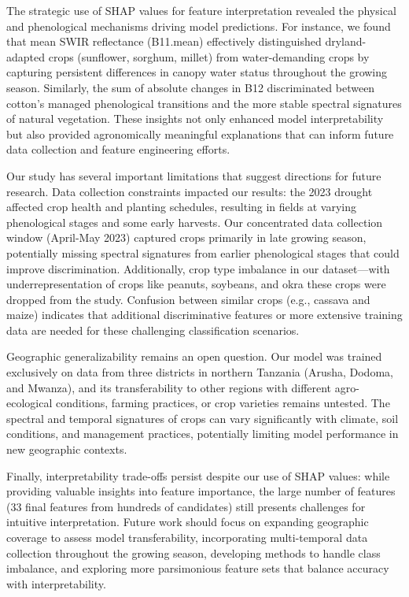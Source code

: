 \documentclass[
  journal,
  twocolumn]{IEEEtran}
\begin{document}
The strategic use of SHAP values for feature interpretation revealed the
physical and phenological mechanisms driving model predictions. For
instance, we found that mean SWIR reflectance (B11.mean) effectively
distinguished dryland-adapted crops (sunflower, sorghum, millet) from
water-demanding crops by capturing persistent differences in canopy
water status throughout the growing season. Similarly, the sum of
absolute changes in B12 discriminated between cotton's managed
phenological transitions and the more stable spectral signatures of
natural vegetation. These insights not only enhanced model
interpretability but also provided agronomically meaningful explanations
that can inform future data collection and feature engineering efforts.

Our study has several important limitations that suggest directions for
future research. Data collection constraints impacted our results: the
2023 drought affected crop health and planting schedules, resulting in
fields at varying phenological stages and some early harvests. Our
concentrated data collection window (April-May 2023) captured crops
primarily in late growing season, potentially missing spectral
signatures from earlier phenological stages that could improve
discrimination. Additionally, crop type imbalance in our dataset---with
underrepresentation of crops like peanuts, soybeans, and okra these
crops were dropped from the study. Confusion between similar crops
(e.g., cassava and maize) indicates that additional discriminative
features or more extensive training data are needed for these
challenging classification scenarios.

Geographic generalizability remains an open question. Our model was
trained exclusively on data from three districts in northern Tanzania
(Arusha, Dodoma, and Mwanza), and its transferability to other regions
with different agro-ecological conditions, farming practices, or crop
varieties remains untested. The spectral and temporal signatures of
crops can vary significantly with climate, soil conditions, and
management practices, potentially limiting model performance in new
geographic contexts.

Finally, interpretability trade-offs persist despite our use of SHAP
values: while providing valuable insights into feature importance, the
large number of features (33 final features from hundreds of candidates)
still presents challenges for intuitive interpretation. Future work
should focus on expanding geographic coverage to assess model
transferability, incorporating multi-temporal data collection throughout
the growing season, developing methods to handle class imbalance, and
exploring more parsimonious feature sets that balance accuracy with
interpretability.
\end{document}
